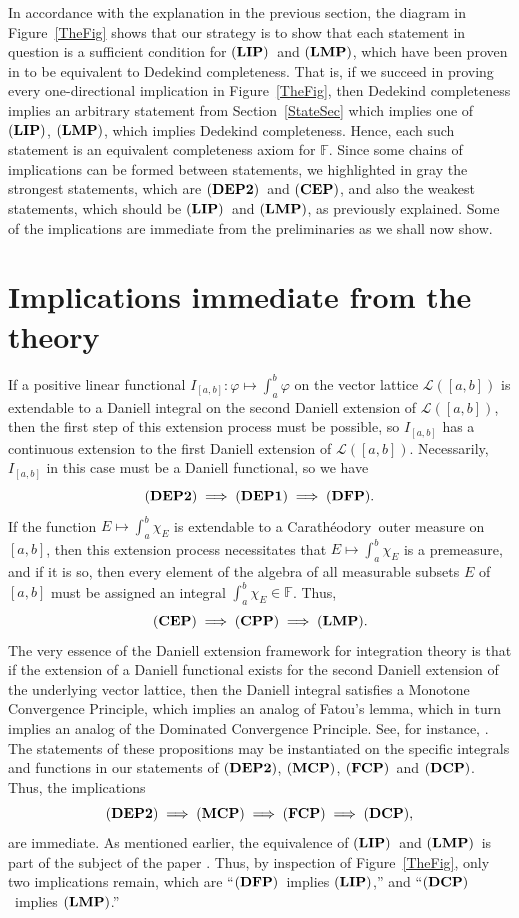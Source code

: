 \documentclass[10pt,a4paper]{amsart}
\def\DCP{\ensuremath{{\bf(DCP_{A})}}}
\def\CEP{\ensuremath{{\bf(CEP)}}}
\def\iDEP{\ensuremath{{\bf(DEP1)}}}
\def\iiDEP{\ensuremath{{\bf(DEP2)}}}
\def\F{\mathbb{F}}
\def\MCP{\ensuremath{{\bf(MCP)}}}
\def\FCP{\ensuremath{{\bf(FCP)}}}
\def\DCP{\ensuremath{{\bf(DCP)}}}
\def\DFP{\ensuremath{{\bf(DFP)}}}
\def\CPP{\ensuremath{{\bf(CPP)}}}
\def\LIP{\ensuremath{{\bf(LIP)}}}
\def\LMP{\ensuremath{{\bf(LMP)}}}
\def\lbrak{\left[}
\def\rbrak{\right]}
\def\abClosed{\lbrak a,b\rbrak}
\def\stepLatt{\mathcal{L}}
\def\elemLatt{\stepLatt(\abClosed)}
\def\elemI{I_{\abClosed}}
\def\Cara{Carath\'{e}odory\  }
\begin{document}
In accordance with the explanation in the previous section, the diagram in Figure~\ref{TheFig} shows that our strategy is to show that each statement in question is a sufficient condition for \LIP\  and \LMP, which have been proven in \cite[Theorem~1]{can24} to be equivalent to Dedekind completeness. That is, if we succeed in proving every one-directional implication in Figure~\ref{TheFig}, then Dedekind completeness implies an arbitrary statement from Section~\ref{StateSec} which implies one of \LIP, \LMP, which implies Dedekind completeness. Hence, each such statement is an equivalent completeness axiom for $\F$. Since some chains of implications can be formed between statements, we highlighted in gray the strongest statements, which are \iiDEP\  and \CEP, and also the weakest statements, which should be \LIP\  and \LMP, as previously explained. Some of the implications are immediate from the preliminaries as we shall now show.

\section{Implications immediate from the theory}\label{ImpliesSec}

If a positive linear functional $\elemI:\varphi\mapsto\int_a^b\varphi$ on the vector lattice $\elemLatt$ is extendable to a Daniell integral on the second Daniell extension of $\elemLatt$, then the first step of this extension process must be possible, so $\elemI$ has a continuous extension to the first Daniell extension of $\elemLatt$. Necessarily, $\elemI$ in this case must be a Daniell functional, so we have
\[\iiDEP\implies\iDEP\implies\DFP.\]
If the function $E\mapsto\int_a^b\chi_E$ is extendable to a \Cara outer measure on $\abClosed$, then this extension process necessitates that $E\mapsto\int_a^b\chi_E$ is a premeasure, and if it is so, then every element of the algebra of all measurable subsets $E$ of $\abClosed$ must be assigned an integral $\int_a^b\chi_E\in\F$. Thus,
\[\CEP\implies\CPP\implies\LMP.\]
The very essence of the Daniell extension framework for integration theory is that if the extension of a Daniell functional exists for the second Daniell extension of the underlying vector lattice, then the Daniell integral satisfies a Monotone Convergence Principle, which implies an analog of Fatou's lemma, which in turn implies an analog of the Dominated Convergence Principle. See, for instance, \cite[Propositions~10,12,13]{roy88}. The statements of these propositions may be instantiated on the specific integrals and functions in our statements of \iiDEP, \MCP, \FCP\  and \DCP. Thus, the implications
\[\iiDEP\implies\MCP\implies\FCP\implies\DCP,\]
are immediate. As mentioned earlier, the equivalence of \LIP\  and \LMP\  is part of the subject of the paper \cite{can24}. Thus, by inspection of Figure~\ref{TheFig}, only two implications remain, which are ``\DFP\  implies \LIP,'' and ``\DCP\  implies \LMP.''
\end{document}

